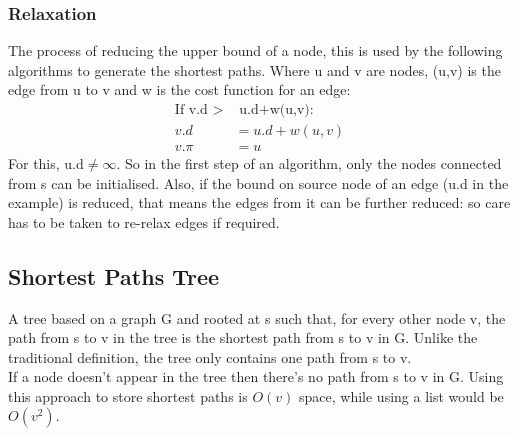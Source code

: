 \subsubsection{Relaxation}
The process of reducing the upper bound of a node, this is used by the following algorithms to generate the shortest paths. Where u and v are nodes, (u,v) is the edge from u to v and w is the cost function for an edge:
\begin{align}
    \text{If v.d $>$} &\text{ u.d+w(u,v):} \nonumber \\
    v.d &= u.d+w(u,v)  \\
    v.\pi &= u \nonumber 
\end{align}
For this, u.d$\neq\infty$. So in the first step of an algorithm, only the nodes connected from s can be initialised. Also, if the bound on source node of an edge (u.d in the example) is reduced, that means the edges from it can be further reduced: so care has to be taken to re-relax edges if required.

\subsection{Shortest Paths Tree}
A tree based on a graph G and rooted at s such that, for every other node v, the path from s to v in the tree is the shortest path from s to v in G. Unlike the traditional definition, the tree only contains one path from s to v. \\
If a node doesn't appear in the tree then there's no path from s to v in G. Using this approach to store shortest paths is $O(v)$ space, while using a list would be $O(v^2).$


